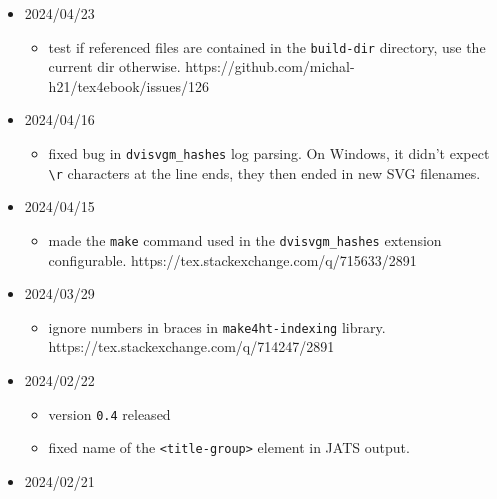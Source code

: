 \begin{itemize}
  \begin{itemize}
  \tightlist
  \item
    create temporary Lg file for Xtpipes.
    https://github.com/michal-h21/make4ht/issues/148\#issuecomment-2136160818
  \item
    fixed handling of the generated ODT file, don't copy it
    unnecessarily and handle build and output directories.
    https://github.com/michal-h21/make4ht/issues/148\#issuecomment-2136160818
  \end{itemize}
\item
  2024/04/23

  \begin{itemize}
  \tightlist
  \item
    test if referenced files are contained in the \texttt{build-dir}
    directory, use the current dir otherwise.
    https://github.com/michal-h21/tex4ebook/issues/126
  \end{itemize}
\item
  2024/04/16

  \begin{itemize}
  \tightlist
  \item
    fixed bug in \texttt{dvisvgm\_hashes} log parsing. On Windows, it
    didn't expect \texttt{\textbackslash{}r} characters at the line
    ends, they then ended in new SVG filenames.
  \end{itemize}
\item
  2024/04/15

  \begin{itemize}
  \tightlist
  \item
    made the \texttt{make} command used in the \texttt{dvisvgm\_hashes}
    extension configurable. https://tex.stackexchange.com/q/715633/2891
  \end{itemize}
\item
  2024/03/29

  \begin{itemize}
  \tightlist
  \item
    ignore numbers in braces in \texttt{make4ht-indexing} library.
    https://tex.stackexchange.com/q/714247/2891
  \end{itemize}
\item
  2024/02/22

  \begin{itemize}
  \tightlist
  \item
    version \texttt{0.4} released
  \item
    fixed name of the \texttt{\textless{}title-group\textgreater{}}
    element in JATS output.
  \end{itemize}
\item
  2024/02/21


\end{itemize}
